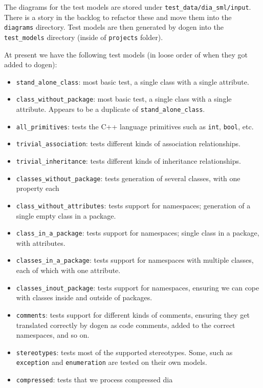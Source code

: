 \documentclass{book}
\begin{document}
The diagrams for the test models are stored under
\texttt{test\_data/dia\_sml/input}. There is a story in the backlog to
refactor these and move them into the \texttt{diagrams}
directory. Test models are then generated by dogen into the
\texttt{test\_models} directory (inside of \texttt{projects} folder).

At present we have the following test models (in loose order of when
they got added to dogen):

\begin{itemize}
\item \texttt{stand\_alone\_class}: most basic test, a single class
  with a single attribute.
\item \texttt{class\_without\_package}: most basic test, a single
  class with a single attribute. Appears to be a duplicate of
  \texttt{stand\_alone\_class}.
\item \texttt{all\_primitives}: tests the C++ language primitives such
  as \texttt{int}, \texttt{bool}, etc.
\item \texttt{trivial\_association}: tests different kinds of
  association relationships.
\item \texttt{trivial\_inheritance}: tests different kinds of
  inheritance relationships.
\item \texttt{classes\_without\_package}: tests generation of several
  classes, with one property each
\item \texttt{class\_without\_attributes}: tests support for
  namespaces; generation of a single empty class in a package.
\item \texttt{class\_in\_a\_package}: tests support for namespaces;
  single class in a package, with attributes.
\item \texttt{classes\_in\_a\_package}: tests support for namespaces
  with multiple classes, each of which with one attribute.
\item \texttt{classes\_inout\_package}: tests support for namespaces,
  ensuring we can cope with classes inside and outside of packages.
\item \texttt{comments}: tests support for different kinds of
  comments, ensuring they get translated correctly by dogen as code
  comments, added to the correct namespaces, and so on.
\item \texttt{stereotypes}: tests most of the supported
  stereotypes. Some, such as \texttt{exception} and
  \texttt{enumeration} are tested on their own models.
\item \texttt{compressed}: tests that we process compressed dia

\end{itemize}
\end{document}
